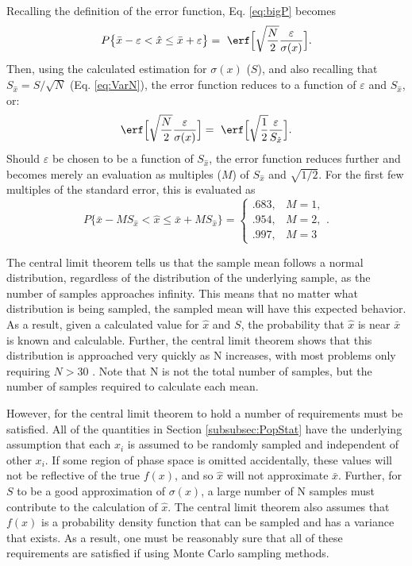 Recalling the definition of the error function, Eq. \eqref{eq:bigP} becomes
\begin{equation}
  P\big\{\bar{x} - \varepsilon < \hat{x} \leq \bar{x} + \varepsilon\big\} = \
    \erf\Big[\sqrt{\frac{N}{2}} \frac{\varepsilon}{\sigma(x)}\Big].
\end{equation}
Then, using the calculated estimation for $\sigma(x)$ ($S$), and also recalling
that $S_{\hat{x}}= S/\sqrt{N}$ (Eq. \eqref{eq:VarN}), the error function reduces to
a function of $\varepsilon$ and $S_{\hat{x}}$, or:
\begin{equation}
    \erf\Big[\sqrt{\frac{N}{2}} \frac{\varepsilon}{\sigma(x)}\Big] = \
    \erf\Big[\sqrt{\frac{1}{2}} \frac{\varepsilon}{S_{\hat{x}}}\Big] .
\end{equation}
Should $\varepsilon$ be chosen to be a function of $S_{\hat{x}}$, the error
function reduces further and becomes merely an evaluation as multiples ($M$) of
$S_{\hat{x}}$ and $\sqrt{1/2}$. For the first few multiples of the standard
error, this is evaluated as
\begin{equation}
  P\big\{\bar{x} - M S_{\hat{x}} < \hat{x} \leq \bar{x} + M S_{\hat{x}} \big\} =
  \begin{cases}
    .683, & M = 1, \\
    .954, & M = 2, \\
    .997, & M = 3
  \end{cases}  .
\end{equation}

The central limit theorem tells us that the sample mean follows a normal
distribution, regardless of the distribution of the underlying sample, as the
number of samples approaches infinity. This
means that no matter what distribution is being sampled, the sampled mean will
have this expected behavior. As a result, given a calculated value for
$\hat{x}$ and $S$, the probability that $\hat{x}$ is near $\bar{x}$ is known
and calculable.
Further, the central limit theorem shows that this distribution is approached
very quickly as N increases, with most problems only requiring $N > 30$
\cite{lewis_computational_1984}. Note
that N is not the total number of samples, but the number of samples required to
calculate each mean.

However, for the central limit theorem to hold a number of
requirements must be satisfied. All of the quantities in Section
\ref{subsubsec:PopStat} have the underlying assumption that
each $x_i$ is assumed to be randomly sampled and
independent of other $x_i$. If some region of phase space is omitted
accidentally, these values will not be reflective of the true $f(x)$, and so
$\hat{x}$ will not approximate $\bar{x}$. Further, for $S$ to be a
good approximation of $\sigma(x)$, a large number of N samples must contribute
to the calculation of $\hat{x}$. The central limit theorem also assumes that
$f(x)$ is a probability density function that can be sampled and has a variance
that exists. As a result, one must be reasonably sure that all of these
requirements are satisfied if using Monte Carlo sampling methods.

